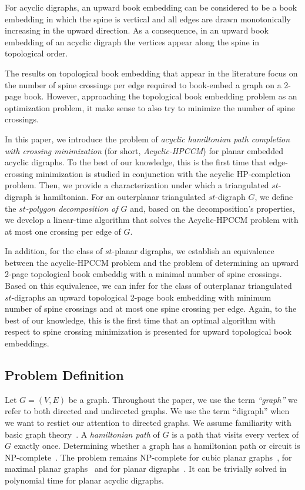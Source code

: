 \documentclass{myllncs-mixalis}
\begin{document}
For acyclic digraphs, an upward book embedding can be considered to
be a book embedding in which the spine is vertical and all edges are
drawn monotonically increasing in the upward direction. As a
consequence, in an upward book embedding of an acyclic digraph the
vertices appear along the spine in topological order.

The results on topological book embedding that appear in the
literature focus on the number of spine crossings per edge required
to book-embed a graph on a 2-page book. However, approaching the
topological book embedding problem as an optimization problem, it
make sense to also try to minimize the number of spine crossings.

In this paper, we introduce the problem of \emph{acyclic hamiltonian
path completion with crossing minimization} (for short,
\emph{Acyclic-HPCCM}) for planar embedded acyclic digraphs. To the
best of our knowledge, this is the first time that edge-crossing
minimization is studied in conjunction with the acyclic
HP-completion problem. Then, we provide a characterization under
which a triangulated $st$-digraph is hamiltonian. For an outerplanar
triangulated $st$-digraph $G$, we define the \emph{$st$-polygon
decomposition of $G$} and, based on the decomposition's properties,
we develop a linear-time algorithm that solves the Acyclic-HPCCM
problem with at most one crossing per edge of $G$.

In addition, for the class of $st$-planar digraphs, we establish an
equivalence between the acyclic-HPCCM problem and the problem of
determining an upward 2-page topological book embeddig with a
minimal number of spine crossings. Based on this equivalence, we can
infer  for the class of outerplanar triangulated $st$-digraphs an
upward topological 2-page book embedding with minimum number of
spine crossings and at most one spine crossing per edge. Again, to
the best of our knowledge, this is the first time that an optimal
algorithm with respect to spine crossing minimization is presented
for upward topological book embeddings.

\subsection{Problem Definition}
\label{sec:problemDefinition}
 Let $G=(V,E)$ be a  graph. Throughout
the paper, we use the term \emph{``graph''} we refer to both
directed and undirected graphs. We use the term ``digraph'' when we
want to restict our attention to directed graphs. We assume
familiarity with basic graph theory~\cite{Harary72,Diestel05}. A
\emph{hamiltonian path} of $G$ is a  path that visits every vertex
of $G$ exactly once. Determining whether a graph has a hamiltonian
path or circuit is NP-complete~\cite{GareyJS74}. The problem remains
NP-complete for cubic planar graphs~\cite{GareyJS74}, for maximal
planar graphs~\cite{Wigderson82}  and for planar
digraphs~\cite{GareyJS74}. It can be trivially solved in polynomial
time for planar acyclic digraphs.
\end{document}
